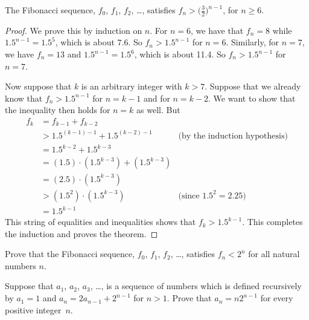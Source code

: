 \begin{theorem}\label{T-Fib}
The Fibonacci sequence, $f_0$, $f_1$, $f_2$, \dots,
satisfies $f_n > \big(\frac{3}{2}\big)^{n-1}$, for $n\ge6$.
\end{theorem}
\begin{proof}
We prove this by induction on $n$.  For $n=6$, we have that 
$f_n=8$ while $1.5^{n-1}=1.5^5$, which is about $7.6$.
So $f_n > 1.5^{n-1}$ for $n=6$.
Similarly, for $n=7$, we have $f_n=13$ and
$1.5^{n-1}=1.5^6$, which is about 11.4.
So $f_n > 1.5^{n-1}$ for $n=7$.

Now suppose that $k$ is an arbitrary integer with $k>7$.
Suppose that we already know that $f_n>1.5^{n-1}$ for
$n=k-1$ and for $n=k-2$.  We want to show that the inequality
then holds for $n=k$ as well.  But
\begin{align*}
   f_k &= f_{k-1}+f_{k-2}\\
       &> 1.5^{(k-1)-1}+1.5^{(k-2)-1} & \text{(by the induction hypothesis)}\\
       &= 1.5^{k-2}+1.5^{k-3}\\
       &= (1.5)\cdot(1.5^{k-3}) + (1.5^{k-3})\\
       &= (2.5)\cdot(1.5^{k-3})\\
       &> (1.5^2)\cdot(1.5^{k-3}) & \text{(since $1.5^2=2.25$)}\\
       &= 1.5^{k-1}
\end{align*}
This string of equalities and inequalities shows that $f_k>1.5^{k-1}$.
This completes the induction and proves the theorem.
\end{proof}



\begin{exercises}

\problem Prove that the Fibonacci sequence, $f_0$, $f_1$, $f_2$, \dots,
satisfies $f_n<2^n$ for all natural numbers $n$.

\problem Suppose that $a_1$, $a_2$, $a_3$, \dots, is a sequence of
numbers which is defined recursively by $a_1=1$ and
$a_n=2a_{n-1}+2^{n-1}$ for $n>1$.  Prove that
$a_n=n2^{n-1}$ for every positive integer~$n$.

\end{exercises}


